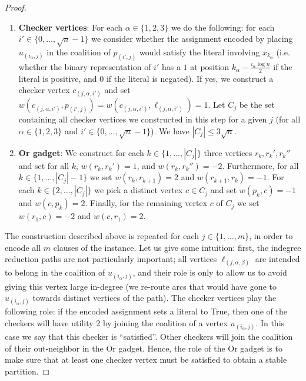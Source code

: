\documentclass[letterpaper,USenglish,cleveref, autoref, thm-restate]{lipics-v2021}
\begin{document}
\begin{proof}
\begin{enumerate}
\item \textbf{Checker vertices}: For each $\alpha\in\{1,2,3\}$ we do the
following: for each $i'\in\{0,\ldots,\sqrt{n}-1\}$ we consider whether the
assignment encoded by placing $u_{(i_{\alpha},j)}$ in the coalition of
$p_{(i',j)}$ would satisfy the literal involving $x_{k_{\alpha}}$ (i.e.
whether the binary representation of $i'$ has a $1$ at position
$k_{\alpha}-\frac{i_{\alpha}\log n}{2}$ if the literal is positive, and $0$ if
the literal is negated).  If yes, we construct a checker vertex
$c_{(j,\alpha,i')}$ and set $w(c_{(j,\alpha,i')},p_{(i',j)}) =
w(c_{(j,\alpha,i')},\ell_{(j,\alpha,i')}) =1$. Let $C_j$ be the set containing
all checker vertices we constructed in this step for a given $j$ (for all
$\alpha\in\{1,2,3\}$ and $i'\in\{0,\ldots,\sqrt{n}-1\}$). We have $|C_j|\le
3\sqrt{n}$.

\item \textbf{Or gadget}: We construct for each $k\in\{1,\ldots,|C_j|\}$ three
vertices $r_k, r_k', r_k''$ and set for all $k$, $w(r_k, r_k')=1$, and
$w(r_k,r_k'')=-2$. Furthermore, for all $k\in\{1,\ldots, |C_j|-1\}$ we set
$w(r_k, r_{k+1}) = 2$ and $w(r_{k+1},r_k)=-1$. For each
$k\in\{2,\ldots,|C_j|\}$ we pick a distinct vertex $c\in C_j$ and set
$w(p_k,c)=-1$ and $w(c,p_k)=2$. Finally, for the remaining vertex $c$ of $C_j$
we set $w(r_1,c)=-2$ and $w(c,r_1)=2$.

\end{enumerate}

The construction described above is repeated for each $j\in\{1,\ldots,m\}$, in
order to encode all $m$ clauses of the instance. Let us give some intuition:
first, the indegree reduction paths are not particularly important; all
vertices $\ell_{(j,\alpha,\beta)}$ are intended to belong in the coalition of
$u_{(i_{\alpha},j)}$, and their role is only to allow us to avoid giving this
vertex large in-degree (we re-route arcs that would have gone to
$u_{(i_{\alpha},j)}$ towards distinct vertices of the path). The checker
vertices play the following role: if the encoded assignment sets a literal to
True, then one of the checkers will have utility $2$ by joining the coalition
of a vertex $u_{(i_{\alpha},j)}$. In this case we say that this checker is
``satisfied''. Other checkers will join the coalition of their out-neighbor in
the Or gadget. Hence, the role of the Or gadget is to make sure that at least
one checker vertex must be satisfied to obtain a stable partition.


\end{proof}
\end{document}
